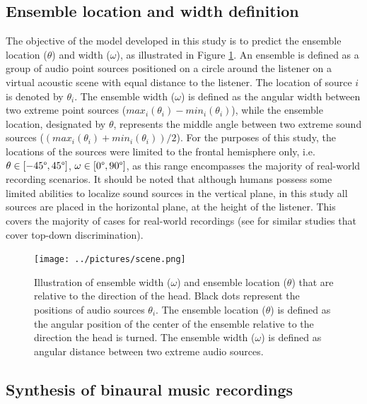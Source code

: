 \documentclass{article}
\begin{document}
\subsection{Ensemble location and width definition}
\label{subsec:ensemble_definition}

The objective of the model developed in this study is to predict the ensemble location ($\theta$) and width ($\omega$), as illustrated in Figure \ref{fig:scene}. An ensemble is defined as a group of audio point sources positioned on a circle around the listener on a virtual acoustic scene with equal distance to the listener. The location of source $i$ is denoted by $\theta_i$. The ensemble width ($\omega$) is defined as the angular width between two extreme point sources ($max_i(\theta_i)-min_i(\theta_i)$), while the ensemble location, designated by $\theta$, represents the middle angle between two extreme sound sources ($(max_i(\theta_i)+min_i(\theta_i))/2$). For the purposes of this study, the locations of the sources were limited to the frontal hemisphere only, i.e. $\theta\in[-45\degree, 45\degree]$, $\omega\in[0\degree, 90\degree]$, as this range encompasses the majority of real-world recording scenarios. It should be noted that although humans possess some limited abilities to localize sound sources in the vertical plane, in this study all sources are placed in the horizontal plane, at the height of the listener. This covers the majority of cases for real-world recordings (see \cite{ma_robust_2018, zielinski_spatial_2022} for similar studies that cover top-down discrimination).

\begin{figure}[ht]
  \centering
  \texttt{[image: ../pictures/scene.png]}
  \caption{\label{fig:scene}Illustration of ensemble width ($\omega$) and ensemble location ($\theta$) that are relative to the direction of the head. Black dots represent the positions of audio sources $\theta_i$. The ensemble location ($\theta$) is defined as the angular position of the center of the ensemble relative to the direction the head is turned. The ensemble width ($\omega$) is defined as angular distance between two extreme audio sources. }
\end{figure}

\subsection{Synthesis of binaural music recordings}
\label{subsec:synthesis}
\end{document}
